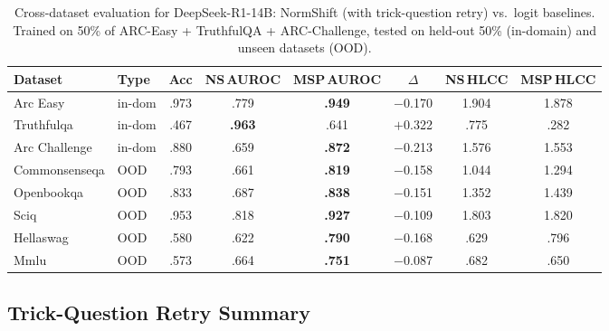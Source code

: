 \documentclass[11pt,a4paper]{article}
\begin{document}
\begin{table}[H]
\centering
\caption{Cross-dataset evaluation for DeepSeek-R1-14B: NormShift (with trick-question retry) vs.\ logit baselines.
         Trained on 50\% of ARC-Easy + TruthfulQA + ARC-Challenge,
         tested on held-out 50\% (in-domain) and unseen datasets (OOD).}
\label{tab:cross-dataset-deepseek-r1-14b}
\small
\begin{tabular}{@{}llcccccc@{}}
\toprule
Dataset & Type & Acc & NS\,AUROC & MSP\,AUROC & $\Delta$ & NS\,HLCC & MSP\,HLCC \\
\midrule
Arc Easy             & in-dom & .973 & .779 & \textbf{.949} & $-$0.170 & 1.904 & 1.878 \\
Truthfulqa           & in-dom & .467 & \textbf{.963} & .641 & $+$0.322 & .775 & .282 \\
Arc Challenge        & in-dom & .880 & .659 & \textbf{.872} & $-$0.213 & 1.576 & 1.553 \\
Commonsenseqa        & OOD & .793 & .661 & \textbf{.819} & $-$0.158 & 1.044 & 1.294 \\
Openbookqa           & OOD & .833 & .687 & \textbf{.838} & $-$0.151 & 1.352 & 1.439 \\
Sciq                 & OOD & .953 & .818 & \textbf{.927} & $-$0.109 & 1.803 & 1.820 \\
Hellaswag            & OOD & .580 & .622 & \textbf{.790} & $-$0.168 & .629 & .796 \\
Mmlu                 & OOD & .573 & .664 & \textbf{.751} & $-$0.087 & .682 & .650 \\
\bottomrule
\end{tabular}
\end{table}

\subsection{Trick-Question Retry Summary}
\end{document}
